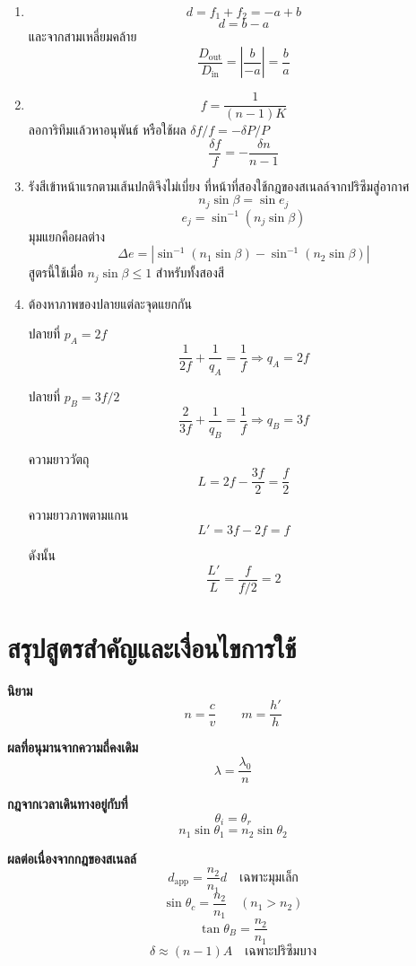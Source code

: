 \begin{enumerate}
    \item
    \[
    d=f_1+f_2=-a+b
    \]
    \[
    \boxed{d=b-a}
    \]
    และจากสามเหลี่ยมคล้าย
    \[
    \boxed{\frac{D_{\text{out}}}{D_{\text{in}}}
    =\left|\frac{b}{-a}\right|=\frac{b}{a}}
    \]

    \item
    \[
    f=\frac{1}{(n-1)K}
    \]
    ลอการิทึมแล้วหาอนุพันธ์ หรือใช้ผล $\delta f/f=-\delta P/P$
    \[
    \boxed{\frac{\delta f}{f}=-\frac{\delta n}{n-1}}
    \]

    \item รังสีเข้าหน้าแรกตามเส้นปกติจึงไม่เบี่ยง ที่หน้าที่สองใช้กฎของสเนลล์จากปริซึมสู่อากาศ
    \[
    n_j\sin\beta=\sin e_j
    \]
    \[
    e_j=\sin^{-1}(n_j\sin\beta)
    \]
    มุมแยกคือผลต่าง
    \[
    \boxed{
    \Delta e
    =
    \left|
    \sin^{-1}(n_1\sin\beta)
    -
    \sin^{-1}(n_2\sin\beta)
    \right|}
    \]
    สูตรนี้ใช้เมื่อ $n_j\sin\beta\le1$ สำหรับทั้งสองสี

    \item ต้องหาภาพของปลายแต่ละจุดแยกกัน

    ปลายที่ $p_A=2f$
    \[
    \frac{1}{2f}+\frac{1}{q_A}=\frac{1}{f}
    \Rightarrow q_A=2f
    \]

    ปลายที่ $p_B=3f/2$
    \[
    \frac{2}{3f}+\frac{1}{q_B}=\frac{1}{f}
    \Rightarrow q_B=3f
    \]

    ความยาววัตถุ
    \[
    L=2f-\frac{3f}{2}=\frac{f}{2}
    \]

    ความยาวภาพตามแกน
    \[
    L'=3f-2f=f
    \]

    ดังนั้น
    \[
    \boxed{\frac{L'}{L}=\frac{f}{f/2}=2}
    \]
\end{enumerate}

\section{สรุปสูตรสำคัญและเงื่อนไขการใช้}

\begin{tcolorbox}[title={การสะท้อนและการหักเห}]
\textbf{นิยาม}
\[
n=\frac{c}{v}
\qquad
m=\frac{h'}{h}
\]

\textbf{ผลที่อนุมานจากความถี่คงเดิม}
\[
\lambda=\frac{\lambda_0}{n}
\]

\textbf{กฎจากเวลาเดินทางอยู่กับที่}
\[
\theta_i=\theta_r
\]
\[
n_1\sin\theta_1=n_2\sin\theta_2
\]

\textbf{ผลต่อเนื่องจากกฎของสเนลล์}
\[
d_{\text{app}}=\frac{n_2}{n_1}d
\quad\text{เฉพาะมุมเล็ก}
\]
\[
\sin\theta_c=\frac{n_2}{n_1}
\quad(n_1>n_2)
\]
\[
\tan\theta_B=\frac{n_2}{n_1}
\]
\[
\delta\approx(n-1)A
\quad\text{เฉพาะปริซึมบาง}
\]
\end{tcolorbox}

